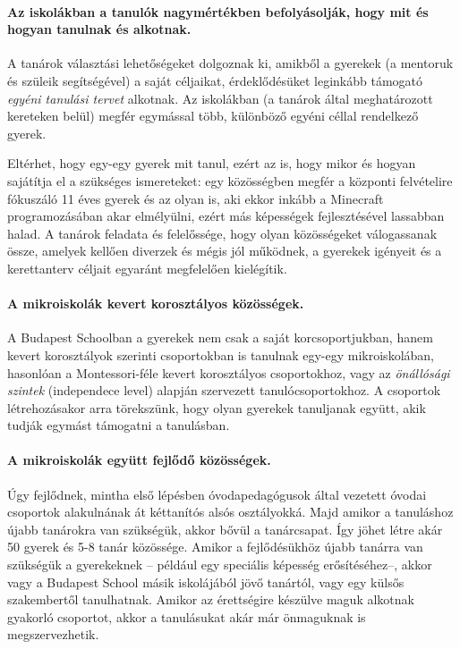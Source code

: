   \paragraph{Az iskolákban a tanulók nagymértékben befolyásolják, hogy mit és hogyan tanulnak és alkotnak.}

    A tanárok választási lehetőségeket dolgoznak ki, amikből a gyerekek (a
    mentoruk és szüleik segítségével) a saját céljaikat, érdeklődésüket leginkább
    támogató \emph{egyéni tanulási tervet} alkotnak. Az iskolákban (a tanárok által
    meghatározott kereteken belül) megfér egymással több, különböző egyéni céllal
    rendelkező gyerek.

    Eltérhet, hogy egy-egy gyerek mit tanul, ezért az is, hogy mikor és hogyan
    sajátítja el a szükséges ismereteket: egy közösségben megfér a központi
    felvételire fókuszáló 11 éves gyerek és az olyan is, aki ekkor inkább a
    Minecraft programozásában akar elmélyülni, ezért más képességek fejlesztésével
    lassabban halad. A tanárok feladata és felelőssége, hogy olyan közösségeket
    válogassanak össze, amelyek kellően diverzek és mégis jól működnek, a gyerekek
    igényeit és a kerettanterv céljait egyaránt megfelelően kielégítik.

  \paragraph{A mikroiskolák kevert korosztályos közösségek.}

    A Budapest Schoolban a gyerekek nem csak a saját korcsoportjukban, hanem kevert korosztályok szerinti csoportokban is tanulnak egy-egy mikroiskolában, hasonlóan a Montessori-féle kevert korosztályos csoportokhoz, vagy az \emph{önállósági szintek} (independece level\cite{indepence_level}) alapján szervezett tanulócsoportokhoz. A csoportok létrehozásakor arra törekszünk, hogy olyan gyerekek tanuljanak együtt, akik tudják egymást támogatni a tanulásban.

  \paragraph{A mikroiskolák együtt fejlődő közösségek.}

    Úgy fejlődnek, mintha első lépésben óvodapedagógusok által vezetett óvodai csoportok
    alakulnának át kéttanítós alsós osztályokká. Majd amikor a tanuláshoz újabb
    tanárokra van szükségük, akkor bővül a tanárcsapat. Így jöhet létre akár 50 gyerek és 5-8
    tanár közössége. Amikor a fejlődésükhöz újabb tanárra van szükségük a
    gyerekeknek -- például egy speciális képesség erősítéséhez--, akkor vagy a
    Budapest School másik iskolájából jövő tanártól, vagy egy külsős szakembertől
    tanulhatnak. Amikor az érettségire készülve maguk alkotnak gyakorló csoportot, akkor a tanulásukat akár már önmaguknak is megszervezhetik.

